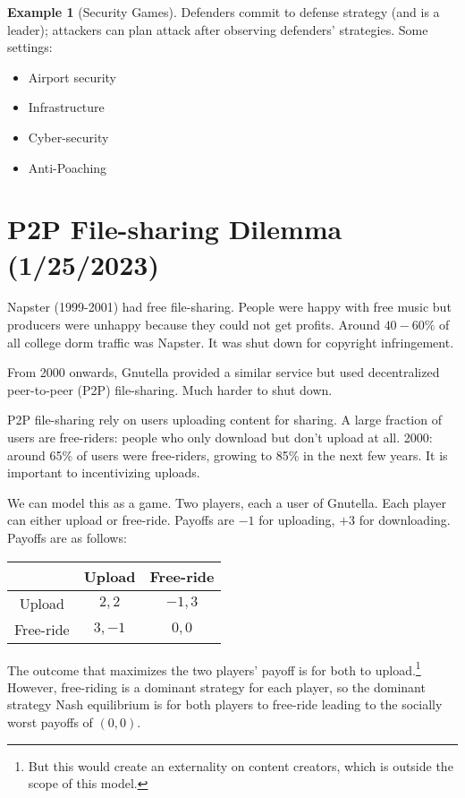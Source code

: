 \documentclass[dvipsnames]{article}
\theoremstyle{definition}
\newtheorem{example}[definition]{Example}
\theoremstyle{remark}
\begin{document}
\begin{example}[Security Games]
	Defenders commit to defense strategy (and is a leader); attackers can plan attack after observing defenders' strategies. Some settings: 
	\begin{itemize}
		\item Airport security
		\item Infrastructure
		\item Cyber-security 
		\item Anti-Poaching
	\end{itemize}
\end{example}

\newpage

\section{P2P File-sharing Dilemma (1/25/2023)}

Napster (1999-2001) had free file-sharing. People were happy with free music but producers were unhappy because they could not get profits. Around $40-60\%$ of all college dorm traffic was Napster. It was shut down for copyright infringement. 

From 2000 onwards, Gnutella provided a similar service but used decentralized peer-to-peer (P2P) file-sharing. Much harder to shut down.

P2P file-sharing rely on users uploading content for sharing. A large fraction of users are free-riders: people who only download but don't upload at all. 2000: around 65\% of users were free-riders, growing to 85\% in the next few years. It is important to incentivizing uploads. 

We can model this as a game. Two players, each a user of Gnutella. Each player can either upload or free-ride. Payoffs are $-1$ for uploading, $+3$ for downloading. Payoffs are as follows: 

\begin{table}[h]\centering
	\begin{tabular}{c|c|c|}
		& Upload & Free-ride\\ \hline
		Upload & $2,2$ & $-1,3$  \\ \hline
		Free-ride & $3,-1$ & $0,0$ \\ \hline
	\end{tabular}
\end{table}

The outcome that maximizes the two players' payoff is for both to upload.\footnote{But this would create an externality on content creators, which is outside the scope of this model.} However, free-riding is a dominant strategy for each player, so the dominant strategy Nash equilibrium is for both players to free-ride leading to the socially worst payoffs of $(0,0)$.
\end{document}

